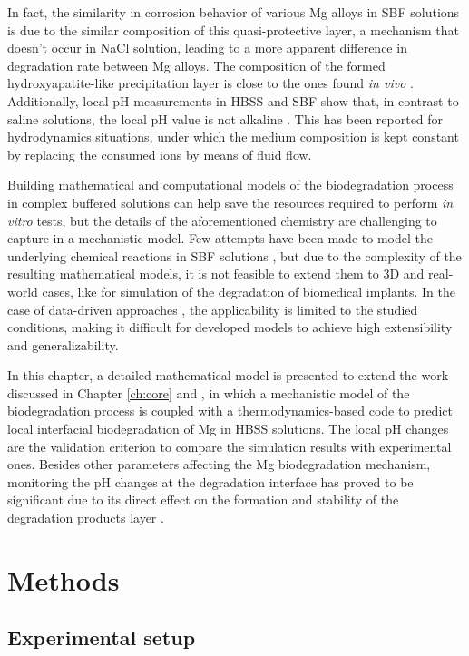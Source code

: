 In fact, the similarity in corrosion behavior of various Mg alloys in {SBF} solutions is due to the similar composition of this quasi-protective layer, a mechanism that doesn't occur in NaCl solution, leading to a more apparent difference in degradation rate between Mg alloys. The composition of the formed hydroxyapatite-like precipitation layer is close to the ones found \textit{in vivo} \cite{Mei2020}. Additionally, local pH measurements in {HBSS} and {SBF} show that, in contrast to saline solutions, the local pH value is not alkaline \cite{Lamaka2018,Mei2021}. This has been reported for hydrodynamics situations, under which the medium composition is kept constant by replacing the consumed ions by means of fluid flow.

Building mathematical and computational models of the biodegradation process in complex buffered solutions can help save the resources required to perform \textit{in vitro} tests, but the details of the aforementioned chemistry are challenging to capture in a mechanistic model. Few attempts have been made to model the underlying chemical reactions in {SBF} solutions \cite{Hoche2014,Dolgikh2019,Zeller-Plumhoff2022}, but due to the complexity of the resulting mathematical models, it is not feasible to extend them to 3D and real-world cases, like for simulation of the degradation of biomedical implants. In the case of data-driven approaches \cite{Zeller-Plumhoff2021}, the applicability is limited to the studied conditions, making it difficult for developed models to achieve high extensibility and generalizability.

In this chapter, a detailed mathematical model is presented to extend the work discussed in Chapter \ref{ch:core} and \cite{Barzegari2021}, in which a mechanistic model of the biodegradation process is coupled with a thermodynamics-based code to predict local interfacial biodegradation of Mg in {HBSS} solutions. The local pH changes are the validation criterion to compare the simulation results with experimental ones. Besides other parameters affecting the Mg biodegradation mechanism, monitoring the pH changes at the degradation interface has proved to be significant due to its direct effect on the formation and stability of the degradation products layer \cite{Gonzalez2021}.


\section{Methods}

\subsection{Experimental setup}


